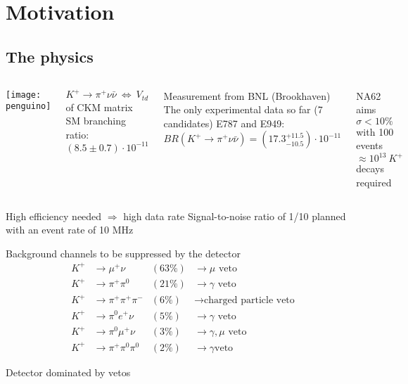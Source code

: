 \section{Motivation}
\subsection{The physics}
\begin{frame}{}{}
	\begin{columns}
	 		\begin{center} 
				\texttt{[image: penguino]}
			\end{center}
	    	\begin{block}{$K^+ \rightarrow \pi^+ \nu \bar{\nu} ~\Leftrightarrow ~
	    	V_{td}$ of CKM matrix} SM branching ratio: $(8.5\pm 0.7)\cdot 10^{-11}$
			\end{block}
			\begin{block}{Measurement from BNL (Brookhaven)}
				The only experimental data so far (7 candidates)
	    		E787 and E949:\\
	    		$BR(K^+ \rightarrow \pi^+ \nu \bar{\nu})=(17.3^{+11.5}_{-10.5})\cdot
	    		10^{-11}$
			\end{block}
			\begin{exampleblock}{NA62 aims $\sigma < 10\%$ with 100 events}
	    		$\approx 10^{13} ~ K^+$ decays required
			\end{exampleblock}
	\end{columns}
	\begin{block}{High efficiency needed $\Rightarrow$ high data rate}
		Signal-to-noise ratio of 1/10 planned with an event rate of 10 MHz
	\end{block}
\end{frame}

\begin{frame}{Background channels to be suppressed by the detector}{}
	\begin{align*}
	   K^+ &\rightarrow \mu^+ \nu &(63\%) &\rightarrow \mu \text{ veto} \\
		 K^+ &\rightarrow \pi^+ \pi^0 &(21\%) &\rightarrow \gamma \text{ veto} \\
	  	 K^+ &\rightarrow \pi^+ \pi^+ \pi^- &(6\%) &\rightarrow \text{charged particle veto} \\
	  	 K^+ &\rightarrow \pi^0 e^+ \nu &(5\%) &\rightarrow \gamma \text{ veto}  \\
	  	  K^+ &\rightarrow \pi^0 \mu^+ \nu &(3\%) &\rightarrow \gamma, \mu \text{ veto} \\
	  	   K^+ &\rightarrow \pi^+ \pi^0 \pi^0 &(2\%) &\rightarrow \gamma \text{
	  	  veto}		  	
	\end{align*}
	\begin{ergo}
		Detector dominated by vetos
	\end{ergo}
\end{frame}

